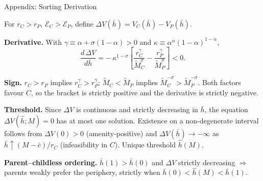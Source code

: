\documentclass[11pt,aspectratio=169]{beamer}
\begin{document}
\begin{frame}{Appendix: Sorting Derivation \; \hyperlink{slide1-main}{}}
\label{app:sorting}
\small

For $r_C > r_P$, $\mathcal E_C > \mathcal E_P$, define
$\Delta V(\bar h) = V_C(\bar h) - V_P(\bar h)$.

\vspace{0.4em}
\textbf{Derivative.} With $\gamma \equiv \alpha + \sigma(1-\alpha) > 0$ and
$\kappa \equiv \alpha^\alpha (1-\alpha)^{1-\alpha}$,
\[
\frac{d\,\Delta V}{d\bar h}
= -\,\kappa^{1-\sigma}\!\left[\frac{r_C^{\gamma}}{\tilde M_C^{\sigma}}
  - \frac{r_P^{\gamma}}{\tilde M_P^{\sigma}}\right] < 0.
\]

\vspace{0.3em}
\textbf{Sign.} $r_C > r_P$ implies $r_C^\gamma > r_P^\gamma$;
$\tilde M_C < \tilde M_P$ implies $\tilde M_C^{-\sigma} > \tilde M_P^{-\sigma}$.
Both factors favour $C$, so the bracket is strictly positive and the
derivative is strictly negative.

\vspace{0.4em}
\textbf{Threshold.} Since $\Delta V$ is continuous and strictly
decreasing in $\bar h$, the equation $\Delta V(\hat h; M) = 0$
has at most one solution. Existence on a non-degenerate interval
follows from $\Delta V(0) > 0$ (amenity-positive) and $\Delta V(\bar h) \to -\infty$
as $\bar h \uparrow (M-\bar c)/r_C$ (infeasibility in $C$). Unique
threshold $\hat h(M)$.

\vspace{0.4em}
\textbf{Parent--childless ordering.} $\bar h(1) > \bar h(0)$ and $\Delta V$
strictly decreasing $\Rightarrow$ parents weakly prefer the periphery,
strictly when $\bar h(0) < \hat h(M) < \bar h(1)$.
\end{frame}
\end{document}
